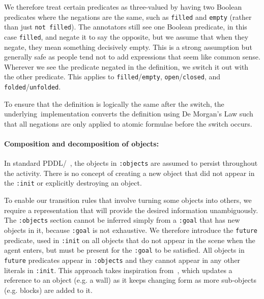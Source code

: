 We therefore treat certain predicates as three-valued by having two Boolean predicates where the negations are the same, such as \texttt{filled} and \texttt{empty} (rather than just \texttt{not filled}). The annotators still see one Boolean predicate, in this case \texttt{filled}, and negate it to say the opposite, but we assume that when they negate, they mean something decisively empty. This is a strong assumption but generally safe as people tend not to add expressions that seem like common sense. Wherever we see the predicate negated in the definition, we switch it out with the other predicate. This applies to \texttt{filled}/\texttt{empty}, \texttt{open}/\texttt{closed}, and \texttt{folded}/\texttt{unfolded}.

To ensure that the definition is logically the same after the switch, the underlying~\bddl implementation converts the definition using De Morgan’s Law such that all negations are only applied to atomic formulae before the switch occurs.


\paragraph{Composition and decomposition of objects:} In standard PDDL/~\bddl, the objects in \texttt{:objects} are assumed to persist throughout the activity. There is no concept of creating a new object that did not appear in the \texttt{:init} or explicitly destroying an object. 

To enable our transition rules that involve turning some objects into others, we require a representation that will provide the desired information unambiguously. The \texttt{:objects} section cannot be inferred simply from a \texttt{:goal} that has new objects in it, because \texttt{:goal} is not exhaustive. We therefore introduce the \texttt{future} predicate, used in \texttt{:init} on all objects that do not appear in the scene when the agent enters, but must be present for the \texttt{:goal} to be satisfied. All objects in \texttt{future} predicates appear in \texttt{:objects} and they cannot appear in any other literals in \texttt{:init}. This approach takes inspiration from~\cite{wichlacz2019ghost}, which updates a reference to an object (e.g. a wall) as it keeps changing form as more sub-objects (e.g. blocks) are added to it.


